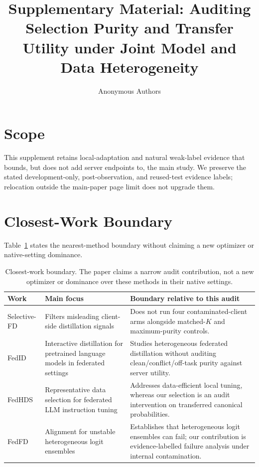 \documentclass[letterpaper]{article}
\title{Supplementary Material: Auditing Selection Purity and Transfer Utility under
Joint Model and Data Heterogeneity}
\author{Anonymous Authors}
\begin{document}
\maketitle
\setlength{\emergencystretch}{1em}

\section{Scope}
This supplement retains local-adaptation and natural weak-label evidence that
bounds, but does not add server endpoints to, the main study.  We preserve the
stated development-only, post-observation, and reused-test evidence labels;
relocation outside the main-paper page limit does not upgrade them.

\section{Closest-Work Boundary}
Table~\ref{tab:closest-boundary} states the nearest-method boundary without
claiming a new optimizer or native-setting dominance.
\begin{table}[t]
\centering
\small
\setlength{\tabcolsep}{3pt}
\begin{tabular}{>{\raggedright\arraybackslash}p{}
                >{\raggedright\arraybackslash}p{}
                >{\raggedright\arraybackslash}p{}}
\toprule
Work & Main focus & Boundary relative to this audit\\
\midrule
Selective-FD \cite{shao2024selectivefd} & Filters misleading client-side
distillation signals & Does not run four contaminated-client arms alongside
matched-\(K\) and maximum-purity controls.\\
FedID \cite{ma2023fedid} & Interactive distillation for pretrained language
models in federated settings & Studies heterogeneous federated distillation
without auditing clean/conflict/off-task purity against server utility.\\
FedHDS \cite{qin2025fedhds} & Representative data selection for federated LLM
instruction tuning & Addresses data-efficient local tuning, whereas our
selection is an audit intervention on transferred canonical probabilities.\\
FedFD \cite{li2025fedfd} & Alignment for unstable heterogeneous logit
ensembles & Establishes that heterogeneous logit ensembles can fail; our
contribution is evidence-labelled failure analysis under internal
contamination.\\
\bottomrule
\end{tabular}
\caption{Closest-work boundary. The paper claims a narrow audit contribution,
not a new optimizer or dominance over these methods in their native settings.}
\label{tab:closest-boundary}
\end{table}
\end{document}

